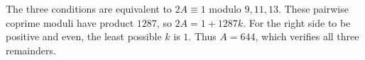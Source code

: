The three conditions are equivalent to $2A\equiv1$ modulo $9,11,13$. These pairwise coprime moduli have product $1287$, so $2A=1+1287k$. For the right side to be positive and even, the least possible $k$ is $1$. Thus $\boxed{A=644}$, which verifies all three remainders.
